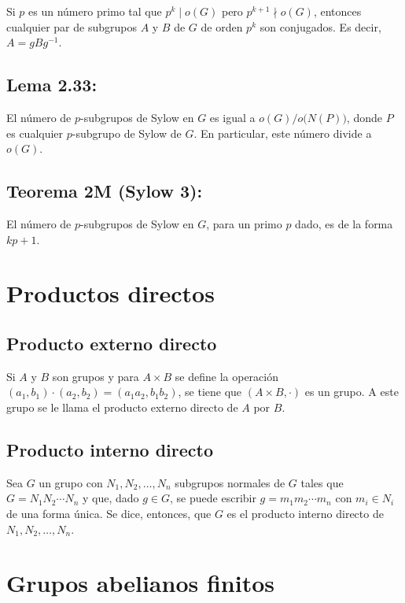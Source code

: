 \documentclass{article}
\begin{document}
Si $p$ es un número primo tal que $p^k\mid o(G)$ pero $p^{k+1}\nmid o(G)$, entonces cualquier par de subgrupos $A$ y $B$ de $G$ de orden $p^k$ son conjugados. Es decir, $A=gBg^{-1}$.

\subsection*{\color{blue} Lema 2.33:}

El número de $p$-subgrupos de Sylow en $G$ es igual a $o(G)/o\big(N(P)\big)$, donde $P$ es cualquier $p$-subgrupo de Sylow de $G$. En particular, este número divide a $o(G)$.

\subsection*{\color{red} Teorema 2M (Sylow 3):}

El número de $p$-subgrupos de Sylow en $G$, para un primo $p$ dado, es de la forma $kp+1$.

\newpage
\section{Productos directos}

\subsection*{\color{violet} Producto externo directo}

Si $A$ y $B$ son grupos y para $A\times B$ se define la operación $(a_1,b_1)\cdot(a_2,b_2)=(a_1a_2,b_1b_2)$, se tiene que $(A\times B,\cdot)$ es un grupo. A este grupo se le llama el producto externo directo de $A$ por $B$.

\subsection*{\color{violet} Producto interno directo}

Sea $G$ un grupo con $N_1,N_2,\ldots,N_n$ subgrupos normales de $G$ tales que $G=N_1N_2\cdots N_n$ y que, dado $g\in G$, se puede escribir $g=m_1m_2\cdots m_n$ con $m_i\in N_i$ de una forma única. Se dice, entonces, que $G$ es el producto interno directo de $N_1,N_2,\ldots,N_n$.



\newpage
\section{Grupos abelianos finitos}
\end{document}
